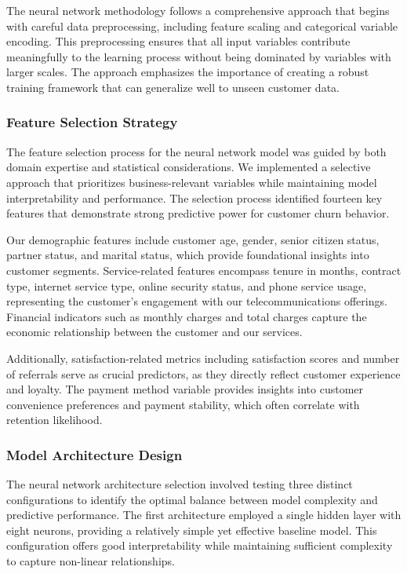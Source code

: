 \documentclass[
]{article}
\begin{document}
The neural network methodology follows a comprehensive approach that
begins with careful data preprocessing, including feature scaling and
categorical variable encoding. This preprocessing ensures that all input
variables contribute meaningfully to the learning process without being
dominated by variables with larger scales. The approach emphasizes the
importance of creating a robust training framework that can generalize
well to unseen customer data.

\hypertarget{feature-selection-strategy}{%
\subsubsection{Feature Selection
Strategy}\label{feature-selection-strategy}}

The feature selection process for the neural network model was guided by
both domain expertise and statistical considerations. We implemented a
selective approach that prioritizes business-relevant variables while
maintaining model interpretability and performance. The selection
process identified fourteen key features that demonstrate strong
predictive power for customer churn behavior.

Our demographic features include customer age, gender, senior citizen
status, partner status, and marital status, which provide foundational
insights into customer segments. Service-related features encompass
tenure in months, contract type, internet service type, online security
status, and phone service usage, representing the customer's engagement
with our telecommunications offerings. Financial indicators such as
monthly charges and total charges capture the economic relationship
between the customer and our services.

Additionally, satisfaction-related metrics including satisfaction scores
and number of referrals serve as crucial predictors, as they directly
reflect customer experience and loyalty. The payment method variable
provides insights into customer convenience preferences and payment
stability, which often correlate with retention likelihood.

\hypertarget{model-architecture-design}{%
\subsubsection{Model Architecture
Design}\label{model-architecture-design}}

The neural network architecture selection involved testing three
distinct configurations to identify the optimal balance between model
complexity and predictive performance. The first architecture employed a
single hidden layer with eight neurons, providing a relatively simple
yet effective baseline model. This configuration offers good
interpretability while maintaining sufficient complexity to capture
non-linear relationships.
\end{document}

